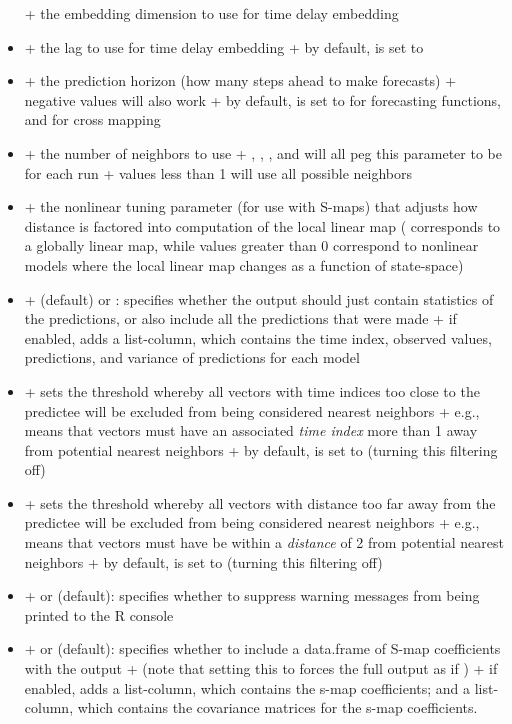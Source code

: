 \documentclass[article]{jss}
\begin{document}
\begin{itemize}
  + the embedding dimension to use for time delay embedding
\item {}
  + the lag to use for time delay embedding
  + by default,  is set to 
\item {}
  + the prediction horizon (how many steps ahead to make forecasts)
  + negative values will also work
  + by default,  is set to  for forecasting functions, and  for cross mapping
\item {}
  + the number of neighbors to use
  + , , , and  will all peg this parameter to be  for each run
  + values less than 1 will use all possible neighbors
\item {}
  + the nonlinear tuning parameter (for use with S-maps) that adjusts how distance is factored into computation of the local linear map ( corresponds to a globally linear map, while values greater than 0 correspond to nonlinear models where the local linear map changes as a function of state-space)
\item {}
  +  (default) or : specifies whether the output should just contain statistics of the predictions, or also include all the predictions that were made
  + if enabled, adds a  list-column, which contains the time index, observed values, predictions, and variance of predictions for each model
\item {}
  +  sets the threshold whereby all vectors with time indices too close to the predictee will be excluded from being considered nearest neighbors
  + e.g.,  means that vectors must have an associated \emph{time index} more than 1 away from potential nearest neighbors
  + by default,  is set to  (turning this filtering off)
\item {}
  +  sets the threshold whereby all vectors with distance too far away from the predictee will be excluded from being considered nearest neighbors
  + e.g.,  means that vectors must have be within a \emph{distance} of 2 from potential nearest neighbors
  + by default,  is set to  (turning this filtering off)
\item {}
  +  or  (default): specifies whether to suppress warning messages from being printed to the R console
\item {}
  +  or  (default): specifies whether to include a data.frame of S-map coefficients with the output
  + (note that setting this to  forces the full output as if )
  + if enabled, adds a  list-column, which contains the s-map coefficients; and a  list-column, which contains the covariance matrices for the s-map coefficients.
\end{itemize}
\end{document}
